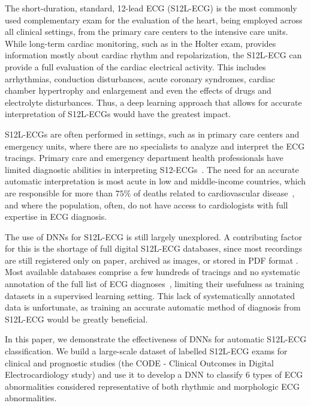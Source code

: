 \documentclass{article}
\begin{document}
The short-duration, standard, 12-lead ECG (S12L-ECG) is the most commonly used complementary exam for the evaluation of the heart, being employed across all clinical settings, from the primary care centers to the intensive care units. While long-term cardiac monitoring, such as in the Holter exam, provides information mostly about cardiac rhythm and repolarization, the S12L-ECG can provide a full evaluation of the cardiac electrical activity. This includes arrhythmias, conduction disturbances, acute coronary syndromes, cardiac chamber hypertrophy and enlargement and even the effects of drugs and electrolyte disturbances. Thus, a deep learning approach that allows for accurate interpretation of S12L-ECGs would have the greatest impact.

S12L-ECGs are often performed in settings, such as in primary care centers and emergency units, where there are no specialists to analyze and interpret the ECG tracings. Primary care and emergency department health professionals have limited diagnostic abilities in interpreting  S12-ECGs~\cite{mant_accuracy_2007, veronese_emergency_2016}. The need for an accurate automatic interpretation is most acute in low and middle-income countries, which are responsible for more than $75\%$ of deaths related to cardiovascular disease~\cite{worldhealthorganization_global_2014}, and where the population, often, do not have access to cardiologists with full expertise in ECG diagnosis. 

The use of DNNs for S12L-ECG is still largely unexplored. A contributing factor for this is the shortage of full digital S12L-ECG databases, since most recordings are still registered only on paper, archived as images, or stored in PDF format \cite{sassi_pdfecg_2017}. Most available databases comprise a few hundreds of tracings and no systematic annotation of the full list of ECG diagnoses~\cite{lyon_computational_2018}, limiting their usefulness as training datasets in a supervised learning setting. This lack of systematically annotated data is unfortunate, as training an accurate automatic method of diagnosis from S12L-ECG would be greatly beneficial.

In this paper, we demonstrate the effectiveness of DNNs for automatic S12L-ECG classification. We build a large-scale dataset of labelled S12L-ECG exams for clinical and prognostic studies (the CODE - Clinical Outcomes in Digital Electrocardiology study) and use it to develop a DNN to classify 6 types of ECG abnormalities considered representative of both rhythmic and morphologic ECG abnormalities.
\end{document}
